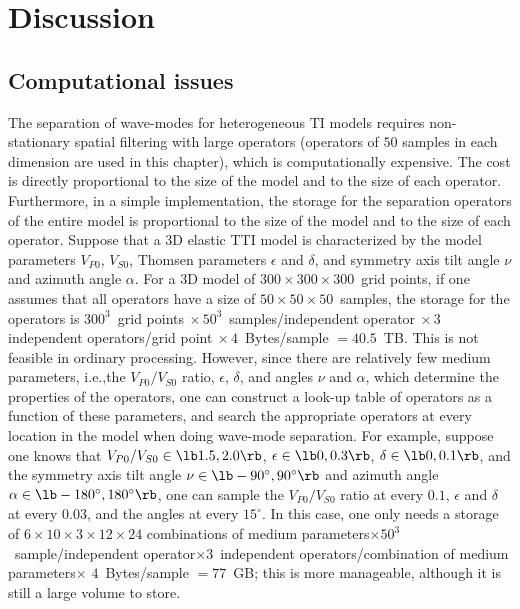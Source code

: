 

\section{Discussion}
\subsection{Computational issues}
The separation of wave-modes for heterogeneous TI models requires
non-stationary spatial filtering with large operators (operators of
$50$ samples in each dimension are used in this chapter), which is
computationally expensive. The cost is directly proportional to the
size of the model and to the size of each operator. Furthermore, in a
simple implementation, the storage for the separation operators of the
entire model is proportional to the size of the model and to the size
of each operator.  Suppose that a 3D elastic TTI model is
characterized by the model parameters $V_{P0}$, $V_{S0}$, Thomsen
parameters $\epsilon$ and $\delta$, and symmetry axis tilt angle $\nu$
and azimuth angle $\alpha$.  For a 3D model of $300 \times
300 \times 300$~grid points, if
one assumes that all operators have a size of $50 \times 50 \times
50$~samples, the storage for the operators is $300^3$~grid
points$~\times 50^3$~samples/independent operator$~\times 3$
independent operators/grid point$~\times 4$~Bytes/sample
$=40.5$~TB. This is not feasible in ordinary processing. However,
since there are relatively few medium parameters, i.e.,the
$V_{P0}/V_{S0}$ ratio, $\epsilon$, $\delta$, and angles $\nu$ and
$\alpha$, which determine the properties of the operators, one can
construct a look-up table of operators as a function of these
parameters, and search the appropriate operators at every location in
the model when doing wave-mode separation. For example, suppose one
knows that $V_{P0}/V_{S0}\in\lb1.5, 2.0\rb$, $\epsilon\in\lb0,
0.3\rb$, $\delta\in\lb0, 0.1\rb$, and the symmetry axis tilt angle
$\nu\in\lb-90^{\circ},90^{\circ}\rb$ and azimuth angle
$\alpha\in\lb-180^{\circ},180^{\circ}\rb$, one can sample the
$V_{P0}/V_{S0}$ ratio at every $0.1$, $\epsilon$ and $\delta$ at every
$0.03$, and the angles at every $15^{\circ}$. In this case, one only
needs a storage of $6 \times 10 \times 3 \times 12 \times 24$
combinations of medium parameters$\times 50^3$~sample/independent
operator$\times 3$~independent operators/combination of medium
parameters$\times$ $4$~Bytes/sample $=77$~GB; this is more manageable,
although it is still a large volume to store.

